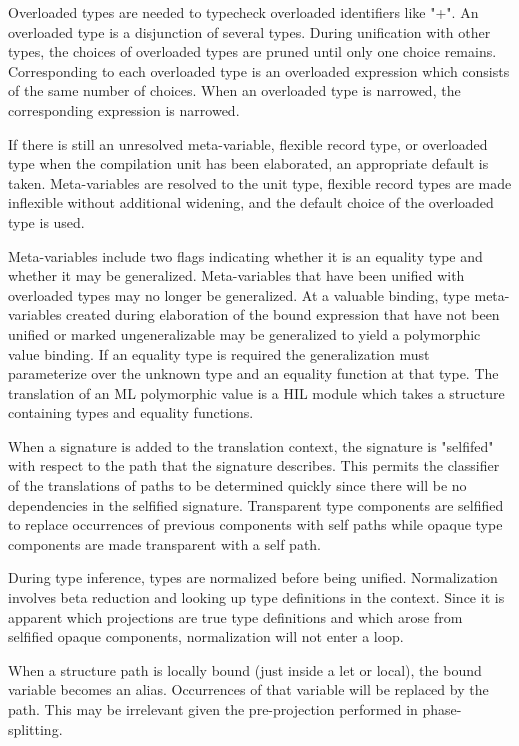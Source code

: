 \documentclass[12pt,twoside]{article}
\begin{document}
Overloaded types are needed to typecheck overloaded identifiers like "+".
An overloaded type is a disjunction of several types.
During unification with other types, the choices of overloaded types are 
pruned until only one choice remains.  Corresponding to each overloaded type
is an overloaded expression which consists of the same number of choices.
When an overloaded type is narrowed, the corresponding expression is narrowed.

If there is still an unresolved meta-variable, flexible record type,
or overloaded type when the compilation unit has been elaborated, an
appropriate default is taken.  Meta-variables are resolved to the unit
type, flexible record types are made inflexible without additional
widening, and the default choice of the overloaded type is used.

Meta-variables include two flags indicating whether it is an equality
type and whether it may be generalized.  Meta-variables that have been
unified with overloaded types may no longer be generalized.  At a
valuable binding, type meta-variables created during elaboration of the
bound expression that have not been unified or marked ungeneralizable
may be generalized to yield a polymorphic value binding.  If an
equality type is required the generalization must parameterize over
the unknown type and an equality function at that type.  The
translation of an ML polymorphic value is a HIL module which takes a
structure containing types and equality functions.

When a signature is added to the translation context, the signature is
"selfifed" with respect to the path that the signature describes.
This permits the classifier of the translations of paths to be
determined quickly since there will be no dependencies in the
selfified signature.  Transparent type components are selfified to
replace occurrences of previous components with self paths while
opaque type components are made transparent with a self path.

During type inference, types are normalized before being unified.
Normalization involves beta reduction and looking up type definitions
in the context.  Since it is apparent which projections are true 
type definitions and which arose from selfified opaque components,
normalization will not enter a loop.

When a structure path is locally bound (just inside a let or local),
the bound variable becomes an alias.  Occurrences of that variable will
be replaced by the path.  This may be irrelevant given the pre-projection
performed in phase-splitting.
\end{document}
